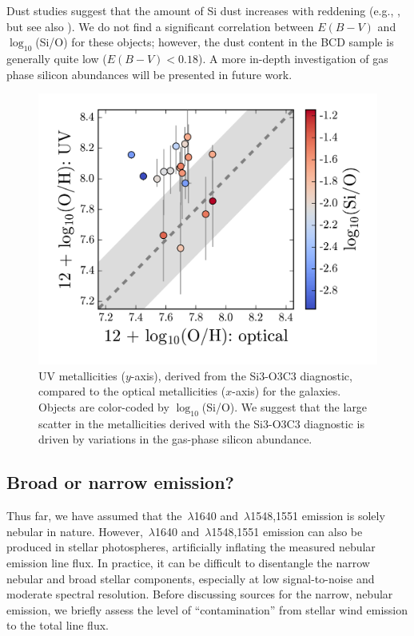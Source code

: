 \documentclass[trackchanges, preprint2]{aastex62}
\newcommand{\heii}{\ion{He}{2}}
\newcommand{\civ}{\ion{C}{4}}
\begin{document}
Dust studies suggest that the amount of Si dust increases with reddening (e.g., \citealt{Haris+2016}, but see also \citealt{Mishra+2017}). We do not find a significant correlation between $E(B-V)$ and $\log_{10}$(Si/O) for these objects; however, the dust content in the BCD sample is generally quite low ($E(B-V)<0.18$). A more in-depth investigation of gas phase silicon abundances will be presented in future work.

\begin{figure}
  \begin{center}
    \includegraphics[width=\linewidth]{figs/f6.png}
    \caption{UV metallicities ($y$-axis), derived from the Si3-O3C3 diagnostic, compared to the optical metallicities ($x$-axis) for the \citet{Berg+2016} galaxies. Objects are color-coded by $\log_{10}$(Si/O). We suggest that the large scatter in the metallicities derived with the Si3-O3C3 diagnostic is driven by variations in the gas-phase silicon abundance.}
    \label{fig:SiO}
  \end{center}
\end{figure}

\subsection{Broad or narrow emission?} \label{sec:discussion:broad}

Thus far, we have assumed that the \heii$\,\lambda$1640 and \civ$\,\lambda$1548,1551 emission is solely nebular in nature. However, \heii$\,\lambda$1640 and \civ$\,\lambda$1548,1551 emission can also be produced in stellar photospheres, artificially inflating the measured nebular emission line flux. In practice, it can be difficult to disentangle the narrow nebular and broad stellar components, especially at low signal-to-noise and moderate spectral resolution. Before discussing sources for the narrow, nebular emission, we briefly assess the level of ``contamination'' from stellar wind emission to the total line flux.
\end{document}
